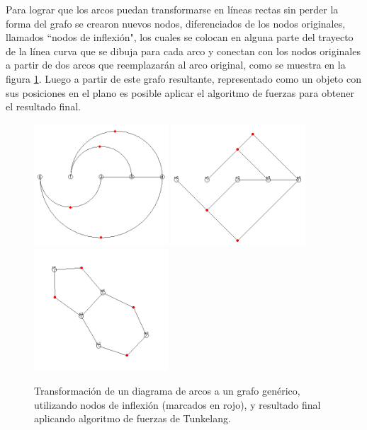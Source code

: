 Para lograr que los arcos puedan transformarse en líneas rectas sin perder la forma del grafo se crearon nuevos nodos, diferenciados de los nodos originales, llamados ``nodos de inflexión", los cuales se colocan en alguna parte del trayecto de la línea curva que se dibuja para cada arco y conectan con los nodos originales a partir de dos arcos que reemplazarán al arco original, como se muestra en la figura \ref{fig:transformacion_arc_generico}. Luego a partir de este grafo resultante, representado como un objeto con sus posiciones en el plano es posible aplicar el algoritmo de fuerzas para obtener el resultado final.

\begin{figure}[H]
	\centering
	\includegraphics[width=5cm]{imagenes/transformacion_arc_generico_1.png}
	\includegraphics[width=5cm]{imagenes/transformacion_arc_generico_3.png}
	\includegraphics[width=5cm]{imagenes/transformacion_arc_generico_2.png}
	\caption{Transformación de un diagrama de arcos a un grafo genérico, utilizando nodos de inflexión (marcados en rojo), y resultado final aplicando algoritmo de fuerzas de Tunkelang.}
	\label{fig:transformacion_arc_generico}
\end{figure}